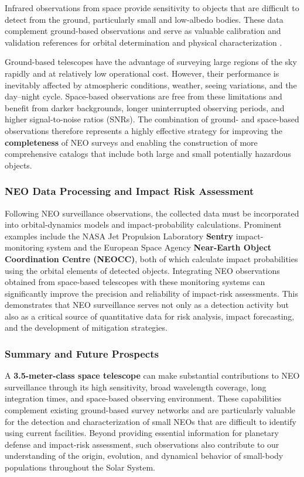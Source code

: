 Infrared observations from space provide sensitivity to objects that are difficult to detect from the ground, particularly small and low-albedo bodies. These data complement ground-based observations and serve as valuable calibration and validation references for orbital determination and physical characterization \cite{mainzer2011}.

Ground-based telescopes have the advantage of surveying large regions of the sky rapidly and at relatively low operational cost. However, their performance is inevitably affected by atmospheric conditions, weather, seeing variations, and the day--night cycle. Space-based observations are free from these limitations and benefit from darker backgrounds, longer uninterrupted observing periods, and higher signal-to-noise ratios (SNRs). The combination of ground- and space-based observations therefore represents a highly effective strategy for improving the \textbf{completeness} of NEO surveys and enabling the construction of more comprehensive catalogs that include both large and small potentially hazardous objects.

\subsubsection{NEO Data Processing and Impact Risk Assessment}

Following NEO surveillance observations, the collected data must be incorporated into orbital-dynamics models and impact-probability calculations. Prominent examples include the NASA Jet Propulsion Laboratory \textbf{Sentry} impact-monitoring system and the European Space Agency \textbf{Near-Earth Object Coordination Centre (NEOCC)}, both of which calculate impact probabilities using the orbital elements of detected objects. Integrating NEO observations obtained from space-based telescopes with these monitoring systems can significantly improve the precision and reliability of impact-risk assessments. This demonstrates that NEO surveillance serves not only as a detection activity but also as a critical source of quantitative data for risk analysis, impact forecasting, and the development of mitigation strategies.

\subsubsection{Summary and Future Prospects}

A \textbf{3.5-meter-class space telescope} can make substantial contributions to NEO surveillance through its high sensitivity, broad wavelength coverage, long integration times, and space-based observing environment. These capabilities complement existing ground-based survey networks and are particularly valuable for the detection and characterization of small NEOs that are difficult to identify using current facilities. Beyond providing essential information for planetary defense and impact-risk assessment, such observations also contribute to our understanding of the origin, evolution, and dynamical behavior of small-body populations throughout the Solar System.

